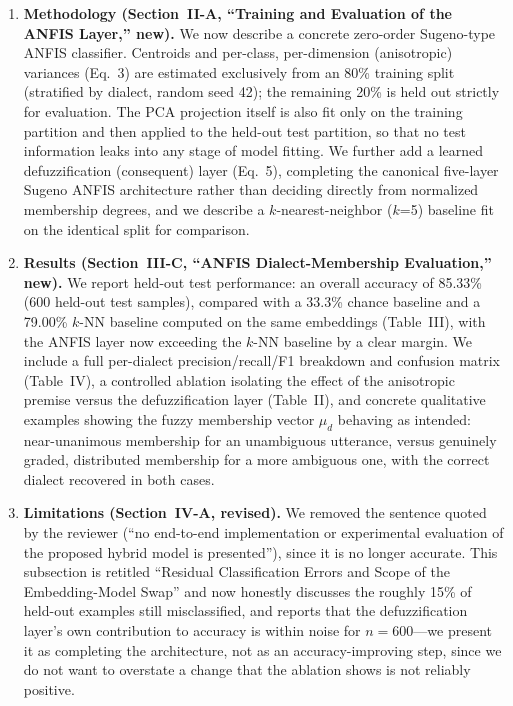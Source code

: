 \documentclass[11pt]{article}
\begin{document}
\begin{enumerate}
\item \textbf{Methodology (Section~II-A, ``Training and Evaluation of the ANFIS Layer,'' new).} We now describe a concrete zero-order Sugeno-type ANFIS classifier. Centroids and per-class, per-dimension (anisotropic) variances (Eq.~3) are estimated exclusively from an 80\% training split (stratified by dialect, random seed 42); the remaining 20\% is held out strictly for evaluation. The PCA projection itself is also fit only on the training partition and then applied to the held-out test partition, so that no test information leaks into any stage of model fitting. We further add a learned defuzzification (consequent) layer (Eq.~5), completing the canonical five-layer Sugeno ANFIS architecture rather than deciding directly from normalized membership degrees, and we describe a $k$-nearest-neighbor ($k$=5) baseline fit on the identical split for comparison.

\item \textbf{Results (Section~III-C, ``ANFIS Dialect-Membership Evaluation,'' new).} We report held-out test performance: an overall accuracy of 85.33\% (600 held-out test samples), compared with a 33.3\% chance baseline and a 79.00\% $k$-NN baseline computed on the same embeddings (Table~III), with the ANFIS layer now exceeding the $k$-NN baseline by a clear margin. We include a full per-dialect precision/recall/F1 breakdown and confusion matrix (Table~IV), a controlled ablation isolating the effect of the anisotropic premise versus the defuzzification layer (Table~II), and concrete qualitative examples showing the fuzzy membership vector $\mu_d$ behaving as intended: near-unanimous membership for an unambiguous utterance, versus genuinely graded, distributed membership for a more ambiguous one, with the correct dialect recovered in both cases.

\item \textbf{Limitations (Section~IV-A, revised).} We removed the sentence quoted by the reviewer (``no end-to-end implementation or experimental evaluation of the proposed hybrid model is presented''), since it is no longer accurate. This subsection is retitled ``Residual Classification Errors and Scope of the Embedding-Model Swap'' and now honestly discusses the roughly 15\% of held-out examples still misclassified, and reports that the defuzzification layer's own contribution to accuracy is within noise for $n=600$---we present it as completing the architecture, not as an accuracy-improving step, since we do not want to overstate a change that the ablation shows is not reliably positive.


\end{enumerate}
\end{document}
